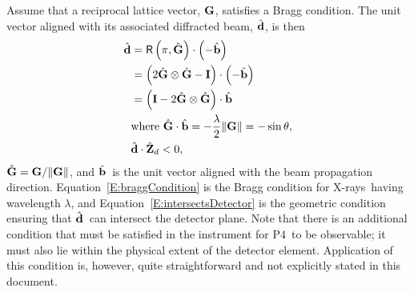 \documentclass[12pt,letterpaper,final]{amsart}
\newcommand{\mbm}[1]{\ensuremath{\mbox{\boldmath$#1$}}}
\newcommand{\gvec}{\ensuremath{\mbm{\mathrm{G}}}}
\newcommand{\ghat}{\ensuremath{\hat{\mbm{\mathrm{G}}}}}
\newcommand{\bhat}{\ensuremath{\hat{\mbm{\mathrm{b}}}}}
\newcommand{\dhat}{\ensuremath{\hat{\mbm{\mathrm{d}}}}}
\newcommand{\eye}{\ensuremath{\mbm{\mathrm{I}}}}
\newcommand{\Pfour}{\ensuremath{\mathrm{P4}}}
\newcommand{\Zd}{\ensuremath{\hat{\mbm{\mathrm{Z}}}_d}}
\newcommand{\eqnref}[1]{Equation~\ref{#1}}
\newcommand{\xrays}{X-rays}
\begin{document}
Assume that a reciprocal lattice vector, \gvec, satisfies a Bragg condition.  The unit vector aligned with its associated diffracted beam, \dhat, is then
\begin{align}
\dhat &= \mathsf{R}\left(\pi, \ghat\right)\cdot\left(-\bhat\right) \nonumber\\
      &= \left(2\ghat\otimes\ghat - \eye\right)\cdot\left(-\bhat\right) \nonumber\\
      &= \left(\eye - 2\ghat\otimes\ghat\right)\cdot\bhat \label{E:dhat}\\
      & \mbox{where } \ghat\cdot\bhat = -\frac{\lambda}{2}\|\gvec\| = -\sin{\theta},  \label{E:braggCondition}\\
      & \dhat\cdot\Zd < 0,  \label{E:intersectsDetector}
\end{align}
$\ghat=\gvec / \|\gvec\|$, and \bhat\ is the unit vector aligned with the beam propagation direction.  \eqnref{E:braggCondition} is the Bragg condition for \xrays\ having wavelength $\lambda$, and \eqnref{E:intersectsDetector} is the geometric condition ensuring that \dhat\ can intersect the detector plane.  Note that there is an additional condition that must be satisfied in the instrument for \Pfour\ to be observable; it must also lie within the physical extent of the detector element.  Application of this condition is, however, quite straightforward and not explicitly stated in this document.
%
\end{document}
